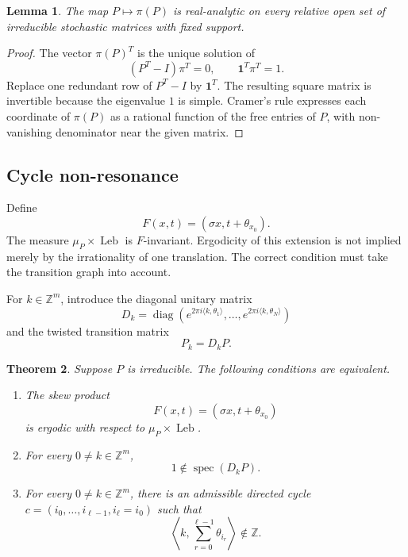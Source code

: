 \documentclass[11pt,a4paper]{amsart}
\newtheorem{theorem}{Theorem}[section]
\newtheorem{lemma}[theorem]{Lemma}
\newcommand{\Z}{\mathbb Z}
\newcommand{\Leb}{\operatorname{Leb}}
\begin{document}
\begin{lemma}\label{lem:stationary-analytic}
The map \(P\mapsto\pi(P)\) is real-analytic on every relative open
set of irreducible stochastic matrices with fixed support.
\end{lemma}

\begin{proof}
The vector \(\pi(P)^T\) is the unique solution of
\[
 (P^T-I)\pi^T=0,\qquad \mathbf1^T\pi^T=1.
\]
Replace one redundant row of \(P^T-I\) by \(\mathbf1^T\).  The
resulting square matrix is invertible because the eigenvalue \(1\) is
simple.  Cramer's rule expresses each coordinate of \(\pi(P)\) as a
rational function of the free entries of \(P\), with non-vanishing
denominator near the given matrix.
\end{proof}

\subsection{Cycle non-resonance}

Define
\[
 F(x,t)=(\sigma x,t+\theta_{x_0}).
\]
The measure \(\mu_P\times\Leb\) is \(F\)-invariant.  Ergodicity of this
extension is not implied merely by the irrationality of one
translation.  The correct condition must take the transition graph
into account.

For \(k\in\Z^m\), introduce the diagonal unitary matrix
\[
 D_k=\operatorname{diag}
 \left(
 e^{2\pi i\langle k,\theta_1\rangle},\ldots,
 e^{2\pi i\langle k,\theta_N\rangle}
 \right)
\]
and the twisted transition matrix
\[
 P_k=D_kP.
\]

\begin{theorem}\label{thm:ergodicity-criterion}
Suppose \(P\) is irreducible.  The following conditions are equivalent.
\begin{enumerate}
 \item The skew product
 \[
 F(x,t)=(\sigma x,t+\theta_{x_0})
 \]
 is ergodic with respect to \(\mu_P\times\Leb\).
 \item For every \(0\ne k\in\Z^m\),
 \[
 1\notin\operatorname{spec}(D_kP).
 \]
 \item For every \(0\ne k\in\Z^m\), there is an admissible directed
 cycle \(c=(i_0,\ldots,i_{\ell-1},i_\ell=i_0)\) such that
 \[
 \left\langle k,\sum_{r=0}^{\ell-1}\theta_{i_r}\right\rangle
 \notin\Z.
 \]
\end{enumerate}
\end{theorem}
\end{document}
